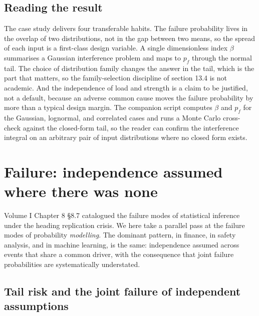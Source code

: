 \subsection{Reading the result}

The case study delivers four transferable habits. The failure
probability lives in the overlap of two distributions, not in the gap
between two means, so the spread of each input is a first-class design
variable. A single dimensionless index $\beta$ summarises a Gaussian
interference problem and maps to $p_{f}$ through the normal tail. The
choice of distribution family changes the answer in the tail, which is
the part that matters, so the family-selection discipline of section
13.4 is not academic. And the independence of load and strength is a
claim to be justified, not a default, because an adverse common cause
moves the failure probability by more than a typical design margin. The
companion script
computes $\beta$ and $p_{f}$ for the Gaussian, lognormal, and
correlated cases and runs a Monte Carlo cross-check against the
closed-form tail, so the reader can confirm the interference integral
on an arbitrary pair of input distributions where no closed form
exists.

\section{Failure: independence assumed where there was none}

Volume I Chapter 8 §8.7 catalogued the failure modes of statistical
inference under the heading replication crisis. We here take a
parallel pass at the failure modes of probability \emph{modelling}.
The dominant pattern, in finance, in safety analysis, and in
machine learning, is the same: independence assumed across events
that share a common driver, with the consequence that joint failure
probabilities are systematically understated.

\subsection{Tail risk and the joint failure of independent assumptions}


